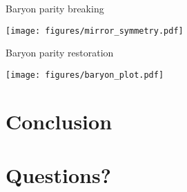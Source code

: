 \documentclass[14pt]{beamer}
\begin{document}
\begin{frame}{Baryon parity breaking}

  \begin{center}
    \texttt{[image: figures/mirror\_symmetry.pdf]}
  \end{center}

\end{frame}

\begin{frame}{Baryon parity restoration}

  \begin{center}
    \texttt{[image: figures/baryon\_plot.pdf]}
  \end{center}

\end{frame}

\section{Conclusion}
\frame{\sectionpage}

\section{Questions?}
\frame{\sectionpage}
\end{document}
